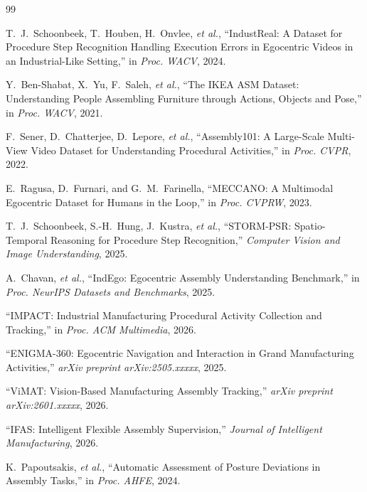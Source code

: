 \documentclass[10pt,twocolumn]{article}
\begin{document}

\begin{thebibliography}{99}

T.~J.~Schoonbeek, T.~Houben, H.~Onvlee, \emph{et al.},
``IndustReal: A Dataset for Procedure Step Recognition Handling Execution Errors in Egocentric Videos in an Industrial-Like Setting,''
in \emph{Proc. WACV}, 2024.

Y.~Ben-Shabat, X.~Yu, F.~Saleh, \emph{et al.},
``The IKEA ASM Dataset: Understanding People Assembling Furniture through Actions, Objects and Pose,''
in \emph{Proc. WACV}, 2021.

F.~Sener, D.~Chatterjee, D.~Lepore, \emph{et al.},
``Assembly101: A Large-Scale Multi-View Video Dataset for Understanding Procedural Activities,''
in \emph{Proc. CVPR}, 2022.

E.~Ragusa, D.~Furnari, and G.~M.~Farinella,
``MECCANO: A Multimodal Egocentric Dataset for Humans in the Loop,''
in \emph{Proc. CVPRW}, 2023.

T.~J.~Schoonbeek, S.-H.~Hung, J.~Kustra, \emph{et al.},
``STORM-PSR: Spatio-Temporal Reasoning for Procedure Step Recognition,''
\emph{Computer Vision and Image Understanding}, 2025.

A.~Chavan, \emph{et al.},
``IndEgo: Egocentric Assembly Understanding Benchmark,''
in \emph{Proc. NeurIPS Datasets and Benchmarks}, 2025.

``IMPACT: Industrial Manufacturing Procedural Activity Collection and Tracking,''
in \emph{Proc. ACM Multimedia}, 2026.

``ENIGMA-360: Egocentric Navigation and Interaction in Grand Manufacturing Activities,''
\emph{arXiv preprint arXiv:2505.xxxxx}, 2025.

``ViMAT: Vision-Based Manufacturing Assembly Tracking,''
\emph{arXiv preprint arXiv:2601.xxxxx}, 2026.

``IFAS: Intelligent Flexible Assembly Supervision,''
\emph{Journal of Intelligent Manufacturing}, 2026.

K.~Papoutsakis, \emph{et al.},
``Automatic Assessment of Posture Deviations in Assembly Tasks,''
in \emph{Proc. AHFE}, 2024.


\end{thebibliography}
\end{document}
